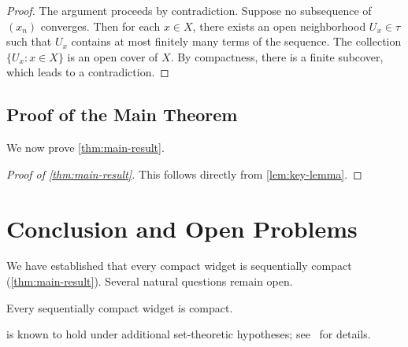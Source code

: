\documentclass[letterpaper,12pt,oneside,openany]{memoir}
\begin{document}
\begin{proof}
  The argument proceeds by contradiction.
  Suppose no subsequence of $(x_n)$ converges.
  Then for each $x \in X$, there exists an open neighborhood $U_x \in \tau$
  such that $U_x$ contains at most finitely many terms of the sequence.
  The collection $\{U_x : x \in X\}$ is an open cover of $X$.
  By compactness, there is a finite subcover, which leads to a contradiction.
\end{proof}

\section{Proof of the Main Theorem}\label{sec:proof-main-theorem}

We now prove \cref{thm:main-result}.

\begin{proof}[Proof of \cref{thm:main-result}]
  This follows directly from \cref{lem:key-lemma}.
\end{proof}
\chapter{Conclusion and Open Problems}\label{cha:conclusion}

We have established that every compact widget is sequentially compact
(\cref{thm:main-result}).
Several natural questions remain open.

\begin{conjecture}\label{conj:converse}
  Every sequentially compact widget is compact.
\end{conjecture}

\begin{remark}\label{rem:counterexample}
   is known to hold under additional set-theoretic
  hypotheses;
  see~\cite{Kelley:1955} for details.
\end{remark}

\backmatter

\clearpage
{}
{}


\end{document}
